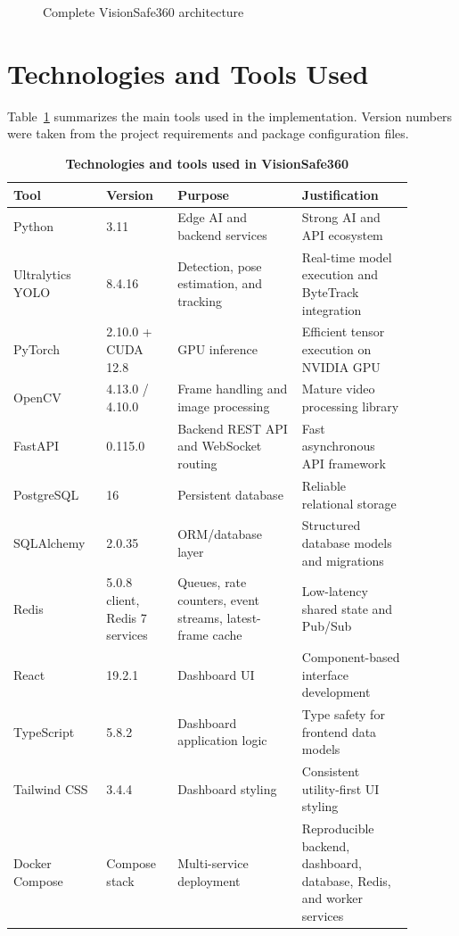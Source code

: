 \begin{figure}[H]
\centering
{}
\caption{Complete VisionSafe360 architecture}
\end{figure}

\section{Technologies and Tools Used}

Table~\ref{tab:chapter5-technologies} summarizes the main tools used in the implementation. Version numbers were taken from the project requirements and package configuration files.

\begin{table}[H]
\centering
\footnotesize
\renewcommand{\arraystretch}{1.45}
\begin{tabular}{|p{0.2\linewidth}|p{0.16\linewidth}|p{0.28\linewidth}|p{0.25\linewidth}|}
\hline
\textbf{Tool} & \textbf{Version} & \textbf{Purpose} & \textbf{Justification} \\
\hline
Python & 3.11 & Edge AI and backend services & Strong AI and API ecosystem \\
\hline
Ultralytics YOLO & 8.4.16 & Detection, pose estimation, and tracking & Real-time model execution and ByteTrack integration \\
\hline
PyTorch & 2.10.0 + CUDA 12.8 & GPU inference & Efficient tensor execution on NVIDIA GPU \\
\hline
OpenCV & 4.13.0 / 4.10.0 & Frame handling and image processing & Mature video processing library \\
\hline
FastAPI & 0.115.0 & Backend REST API and WebSocket routing & Fast asynchronous API framework \cite{fastapi_docs} \\
\hline
PostgreSQL & 16 & Persistent database & Reliable relational storage \cite{postgres_docs} \\
\hline
SQLAlchemy & 2.0.35 & ORM/database layer & Structured database models and migrations \\
\hline
Redis & 5.0.8 client, Redis 7 services & Queues, rate counters, event streams, latest-frame cache & Low-latency shared state and Pub/Sub \cite{redis_docs} \\
\hline
React & 19.2.1 & Dashboard UI & Component-based interface development \cite{react_docs} \\
\hline
TypeScript & 5.8.2 & Dashboard application logic & Type safety for frontend data models \\
\hline
Tailwind CSS & 3.4.4 & Dashboard styling & Consistent utility-first UI styling \\
\hline
Docker Compose & Compose stack & Multi-service deployment & Reproducible backend, dashboard, database, Redis, and worker services \cite{docker_compose_docs} \\
\hline
\end{tabular}
\caption{\textbf{Technologies and tools used in VisionSafe360}}
\label{tab:chapter5-technologies}
\end{table}


